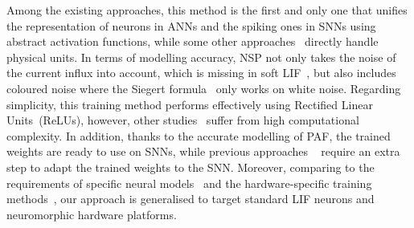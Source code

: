 

Among the existing approaches, this method is the first and only one that unifies the representation of neurons in ANNs and the spiking ones in SNNs using abstract activation functions, while some other approaches~\citep{Jug_etal_2012,hunsberger2015spiking} directly handle physical units.
In terms of modelling accuracy, NSP not only takes the noise of the current influx \DIFaddbegin {}\DIFaddend into account, which is missing in soft LIF~\citep{hunsberger2015spiking}, but also includes coloured noise where the Siegert formula~\citep{Jug_etal_2012} only works on white noise.
Regarding simplicity, this training method performs effectively using Rectified Linear Units~(ReLUs), however, other studies~\citep{Jug_etal_2012,hunsberger2015spiking} suffer from high computational complexity.
In addition, thanks to the accurate modelling of PAF, the trained weights are ready to use on SNNs, while previous approaches ~\citep{cao2015spiking,diehl2015fast} require an extra step to adapt the trained weights to the SNN.
Moreover, comparing to the requirements of specific neural models~\citep{cao2015spiking,diehl2015fast} and the hardware-specific training methods~\citep{diehl2016conversion,diehl2016truehappiness,esser2015backpropagation}, our approach is generalised to target standard LIF neurons and neuromorphic hardware platforms.

